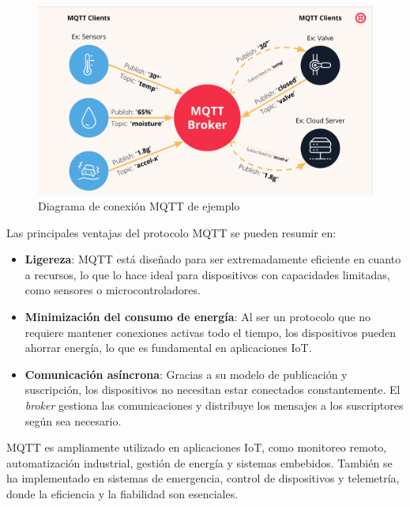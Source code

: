 \begin{figure}[H]
    \centering
    \includegraphics[width = 0.8 \linewidth]{img/mqtt.png}
    \caption{Diagrama de conexión MQTT de ejemplo \cite{mqtt_img}}
    \label{fig:mqtt}
\end{figure}



Las principales ventajas del protocolo MQTT se pueden resumir en:

\begin{itemize}
    \item \textbf{Ligereza}: MQTT está diseñado para ser extremadamente eficiente en cuanto a recursos, lo que lo hace ideal para dispositivos con capacidades limitadas, como sensores o microcontroladores.
    \item \textbf{Minimización del consumo de energía}: Al ser un protocolo que no requiere mantener conexiones activas todo el tiempo, los dispositivos pueden ahorrar energía, lo que es fundamental en aplicaciones IoT.
    \item \textbf{Comunicación asíncrona}: Gracias a su modelo de publicación y suscripción, los dispositivos no necesitan estar conectados constantemente. El \textit{broker} gestiona las comunicaciones y distribuye los mensajes a los suscriptores según sea necesario.
\end{itemize}



MQTT es ampliamente utilizado en aplicaciones IoT, como monitoreo remoto, automatización industrial, gestión de energía y sistemas embebidos. También se ha implementado en sistemas de emergencia, control de dispositivos y telemetría, donde la eficiencia y la fiabilidad son esenciales.